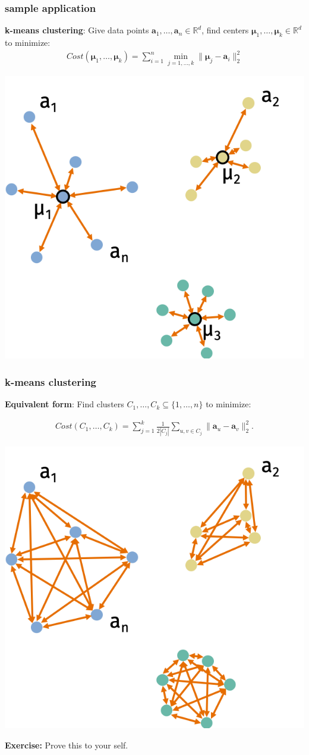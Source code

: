 \documentclass[compress]{beamer}
\newcommand{\bs}[1]{\boldsymbol{#1}}
\newcommand{\bv}[1]{\mathbf{#1}}
\newcommand{\R}{\mathbb{R}}
\begin{document}
\begin{frame}[t]
	\frametitle{sample application}
	\textbf{k-means clustering}: Give data points $\bv{a}_1,\ldots, \bv{a}_n \in \R^d$, find centers $\bs{\mu}_1, \ldots, \bs{\mu}_k\in \R^d$ to minimize:
	\begin{align*}
		Cost(\bs{\mu}_1,\ldots, \bs{\mu}_k) = \sum_{i=1}^n \min_{j = 1,\ldots,k} \|\bs{\mu}_j - \bv{a}_i\|_2^2
	\end{align*}
	\begin{center}
		\includegraphics[width=.5\textwidth]{kmeans3.png}
	\end{center}
\end{frame}

\begin{frame}[t]
	\frametitle{k-means clustering}
	\textbf{Equivalent form}: Find clusters $C_1, \ldots, C_k \subseteq \{1, \ldots, n\}$ to minimize:
	\vspace{-3em}
	
	\begin{align*}
		Cost(C_1,\ldots, C_k) = \sum_{j=1}^k \frac{1}{2|C_j|}\sum_{u,v\in C_j} \|\bv{a}_u - \bv{a}_v\|_2^2.
	\end{align*}
	\vspace{-2em}
	\begin{center}
		\includegraphics[width=.5\textwidth]{kmeans4.png}
	\end{center}
	\textbf{Exercise:} Prove this to your self.
\end{frame}
\end{document}
